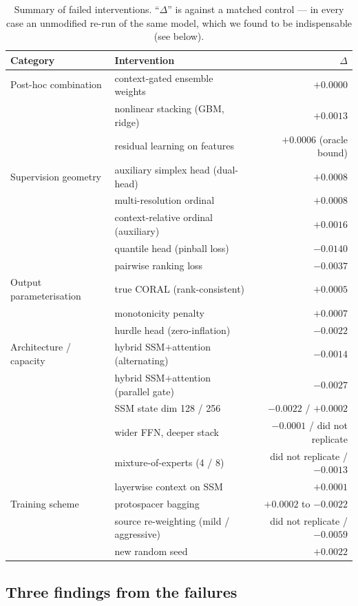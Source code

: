 \documentclass[11pt]{article}
\begin{document}
\begin{table}[H]
\centering
\caption{Summary of failed interventions. ``$\Delta$'' is against a matched control ---
in every case an unmodified re-run of the same model, which we found to be
indispensable (see below).}
\label{tab:negatives}
\begin{tabular}{llr}
\toprule
Category & Intervention & $\Delta$ \\
\midrule
Post-hoc combination
 & context-gated ensemble weights & $+0.0000$ \\
 & nonlinear stacking (GBM, ridge) & $+0.0013$ \\
 & residual learning on features & $+0.0006$ (oracle bound) \\
\midrule
Supervision geometry
 & auxiliary simplex head (dual-head) & $+0.0008$ \\
 & multi-resolution ordinal & $+0.0008$ \\
 & context-relative ordinal (auxiliary) & $+0.0016$ \\
 & quantile head (pinball loss) & $-0.0140$ \\
 & pairwise ranking loss & $-0.0037$ \\
\midrule
Output parameterisation
 & true CORAL (rank-consistent) & $+0.0005$ \\
 & monotonicity penalty & $+0.0007$ \\
 & hurdle head (zero-inflation) & $-0.0022$ \\
\midrule
Architecture / capacity
 & hybrid SSM$+$attention (alternating) & $-0.0014$ \\
 & hybrid SSM$+$attention (parallel gate) & $-0.0027$ \\
 & SSM state dim 128 / 256 & $-0.0022$ / $+0.0002$ \\
 & wider FFN, deeper stack & $-0.0001$ / did not replicate \\
 & mixture-of-experts (4 / 8) & did not replicate / $-0.0013$ \\
 & layerwise context on SSM & $+0.0001$ \\
\midrule
Training scheme
 & protospacer bagging & $+0.0002$ to $-0.0022$ \\
 & source re-weighting (mild / aggressive) & did not replicate / $-0.0059$ \\
 & new random seed & $+0.0022$ \\
\bottomrule
\end{tabular}
\end{table}

\subsection{Three findings from the failures}
\end{document}
